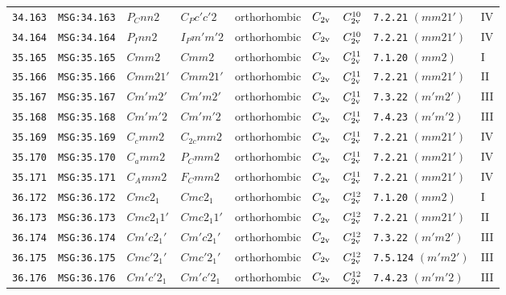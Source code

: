\documentclass[fleqn,10pt]{jsarticle}
\begin{document}
\begin{center}
\begin{longtable}{lllllllll}
\texttt{34.163} & \texttt{MSG:34.163} & $P_{C}nn2$ & $C_{P}c'c'2$ & orthorhombic & $C_{\rm 2v}$ & $C_{\rm 2v}^{10}$ & \texttt{7.2.21} $(mm21')$ & IV \\
\texttt{34.164} & \texttt{MSG:34.164} & $P_{I}nn2$ & $I_{P}m'm'2$ & orthorhombic & $C_{\rm 2v}$ & $C_{\rm 2v}^{10}$ & \texttt{7.2.21} $(mm21')$ & IV \\ \hline
\texttt{35.165} & \texttt{MSG:35.165} & $Cmm2$ & $Cmm2$ & orthorhombic & $C_{\rm 2v}$ & $C_{\rm 2v}^{11}$ & \texttt{7.1.20} $(mm2)$ & I \\
\texttt{35.166} & \texttt{MSG:35.166} & $Cmm21'$ & $Cmm21'$ & orthorhombic & $C_{\rm 2v}$ & $C_{\rm 2v}^{11}$ & \texttt{7.2.21} $(mm21')$ & II \\
\texttt{35.167} & \texttt{MSG:35.167} & $Cm'm2'$ & $Cm'm2'$ & orthorhombic & $C_{\rm 2v}$ & $C_{\rm 2v}^{11}$ & \texttt{7.3.22} $(m'm2')$ & III \\
\texttt{35.168} & \texttt{MSG:35.168} & $Cm'm'2$ & $Cm'm'2$ & orthorhombic & $C_{\rm 2v}$ & $C_{\rm 2v}^{11}$ & \texttt{7.4.23} $(m'm'2)$ & III \\
\texttt{35.169} & \texttt{MSG:35.169} & $C_{c}mm2$ & $C_{2c}mm2$ & orthorhombic & $C_{\rm 2v}$ & $C_{\rm 2v}^{11}$ & \texttt{7.2.21} $(mm21')$ & IV \\
\texttt{35.170} & \texttt{MSG:35.170} & $C_{a}mm2$ & $P_{C}mm2$ & orthorhombic & $C_{\rm 2v}$ & $C_{\rm 2v}^{11}$ & \texttt{7.2.21} $(mm21')$ & IV \\
\texttt{35.171} & \texttt{MSG:35.171} & $C_{A}mm2$ & $F_{C}mm2$ & orthorhombic & $C_{\rm 2v}$ & $C_{\rm 2v}^{11}$ & \texttt{7.2.21} $(mm21')$ & IV \\ \hline
\texttt{36.172} & \texttt{MSG:36.172} & $Cmc2_{1}$ & $Cmc2_{1}$ & orthorhombic & $C_{\rm 2v}$ & $C_{\rm 2v}^{12}$ & \texttt{7.1.20} $(mm2)$ & I \\
\texttt{36.173} & \texttt{MSG:36.173} & $Cmc2_{1}1'$ & $Cmc2_{1}1'$ & orthorhombic & $C_{\rm 2v}$ & $C_{\rm 2v}^{12}$ & \texttt{7.2.21} $(mm21')$ & II \\
\texttt{36.174} & \texttt{MSG:36.174} & $Cm'c2_{1}'$ & $Cm'c2_{1}'$ & orthorhombic & $C_{\rm 2v}$ & $C_{\rm 2v}^{12}$ & \texttt{7.3.22} $(m'm2')$ & III \\
\texttt{36.175} & \texttt{MSG:36.175} & $Cmc'2_{1}'$ & $Cmc'2_{1}'$ & orthorhombic & $C_{\rm 2v}$ & $C_{\rm 2v}^{12}$ & \texttt{7.5.124} $(m'm2')$ & III \\
\texttt{36.176} & \texttt{MSG:36.176} & $Cm'c'2_{1}$ & $Cm'c'2_{1}$ & orthorhombic & $C_{\rm 2v}$ & $C_{\rm 2v}^{12}$ & \texttt{7.4.23} $(m'm'2)$ & III \\

\end{longtable}
\end{center}
\end{document}
